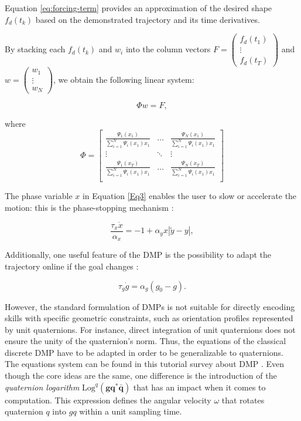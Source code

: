 \documentclass[conference]{IEEEtran}
\begin{document}
Equation \eqref{eq:forcing-term} provides an approximation of the desired shape $f_d(t_k)$ based on the demonstrated trajectory and its time derivatives.

By stacking each $f_d(t_k)$ and $w_i$ into the column vectors $F = \begin{pmatrix} f_d(t_1) \\ \vdots \\ f_d(t_T) \end{pmatrix}$ and $w = \begin{pmatrix} w_1 \\ \vdots \\ w_N \end{pmatrix}$, we obtain the following linear system:

\begin{equation}
\Phi w = F, 
\end{equation}

where
\begin{equation}
\Phi = \begin{bmatrix} 
    \frac{\Psi_1(x_1)}{\sum_{i=1}^{N} \Psi_i(x_1)x_1} & \ldots & \frac{\Psi_N(x_1)}{\sum_{i=1}^{N} \Psi_i(x_1)x_1} \\
    \vdots & \ddots & \vdots\\
    \frac{\Psi_1(x_T)}{\sum_{i=1}^{N} \Psi_i(x_1)x_1} & \ldots & \frac{\Psi_N(x_T)}{\sum_{i=1}^{N} \Psi_i(x_1)x_1} \\
    \end{bmatrix}
\end{equation} \newline

The phase variable $x$ in Equation \eqref{Eq3} enables the user to slow or accelerate the motion: this is the phase-stopping mechanism \cite{ijspeert_movement_2002}:

\begin{equation}
\frac{\tau_x \dot{x}}{\alpha_x} = -1 + \alpha_y x \left| \tilde{y} - y \right|, 
\end{equation}

Additionally, one useful feature of the DMP is the possibility to adapt the trajectory online if the goal changes \cite{ijspeert_dynamical_2013}:

\begin{equation}
\tau_g \dot{g} = \alpha_g (g_0 - g). 
\end{equation}

However, the standard formulation of DMPs is not suitable for directly encoding skills with specific geometric constraints, such as orientation profiles represented by unit quaternions. For instance, direct integration of unit quaternions does not ensure the unity of the quaternion's norm. Thus, the equations of the classical discrete DMP have to be adapted in order to be generalizable to quaternions. The equations system can be found in this tutorial survey about DMP \cite{saveriano_dynamic_2021}. Even though the core ideas are the same, one difference is the introduction of the \emph{quaternion logarithm} \(\text{Log}^q (\boldsymbol{gq}^* \boldsymbol{\bar{q}})\) that has an impact when it comes to computation. This expression defines the angular velocity \(\omega\) that rotates quaternion \(q\) into \(gq\) within a unit sampling time.
\end{document}

